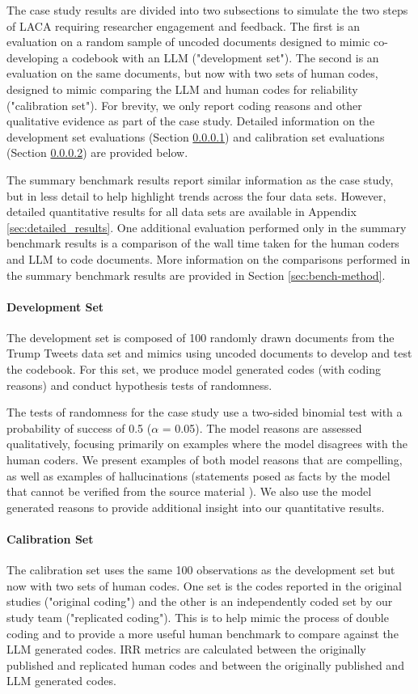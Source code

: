 \documentclass{article}
\begin{document}
The case study results are divided into two subsections to simulate the two steps of LACA requiring researcher engagement and feedback. The first is an evaluation on a random sample of uncoded documents designed to mimic co-developing a codebook with an LLM ("development set").  The second is an evaluation on the same documents, but now with two sets of human codes, designed to mimic comparing the LLM and human codes for reliability ("calibration set"). For brevity, we only report coding reasons and other qualitative evidence as part of the case study.  Detailed information on the development set evaluations (Section \ref{sec:dev-method}) and calibration set evaluations (Section \ref{sec:cal-method}) are provided below.

The summary benchmark results report similar information as the case study, but in less detail to help highlight trends across the four data sets.  However, detailed quantitative results for all data sets are available in Appendix \ref{sec:detailed_results}. One additional evaluation performed only in the summary benchmark results is a comparison of the wall time taken for the human coders and LLM to code documents. More information on the comparisons performed in the summary benchmark results are provided in Section \ref{sec:bench-method}.

\paragraph{Development Set}
\label{sec:dev-method}
The development set is composed of 100 randomly drawn documents from the Trump Tweets data set and mimics using uncoded documents to develop and test the codebook.  For this set, we produce model generated codes (with coding reasons) and conduct hypothesis tests of randomness.

The tests of randomness for the case study use a two-sided binomial test with a probability of success of 0.5 ($\alpha$ = 0.05). The model reasons are assessed qualitatively, focusing primarily on examples where the model disagrees with the human coders.  We present examples of both model reasons that are compelling, as well as examples of hallucinations (statements posed as facts by the model that cannot be verified from the source material \cite{bang2023multitask}). We also use the model generated reasons to provide additional insight into our quantitative results.

\paragraph{Calibration Set}
\label{sec:cal-method}
The calibration set uses the same 100 observations as the development set but now with two sets of human codes.  One set is the codes reported in the original studies ("original coding") and the other is an independently coded set by our study team ("replicated coding").  This is to help mimic the process of double coding and to provide a more useful human benchmark to compare against the LLM generated codes.  IRR metrics are calculated between the originally published and replicated human codes and between the originally published and LLM generated codes.  
\end{document}
